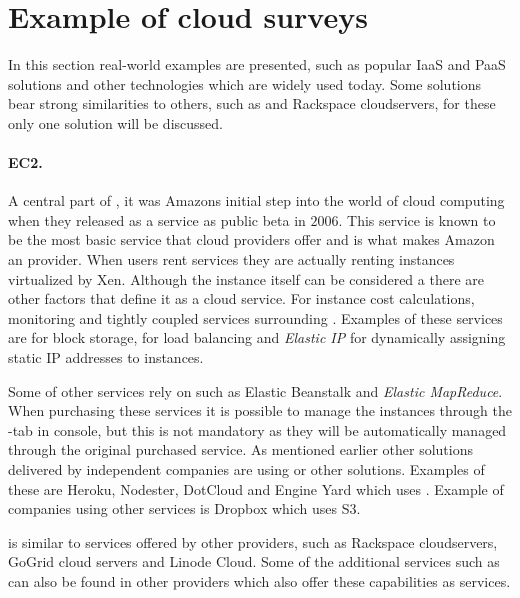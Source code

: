 \section{Example of cloud surveys}

In this section real-world examples are presented, such as popular IaaS and PaaS solutions
and other technologies which are widely used today.
Some solutions bear strong similarities to others, such as  and Rackspace cloudservers,
for these only one solution will be discussed.

\paragraph{EC2.}

A central part of , it was Amazons initial step into the world of cloud computing when
they released  as a service as public beta in $2006$.
This service is known to be the most basic service that cloud providers offer and is 
what makes Amazon an  provider.
When users rent  services they are actually renting  
instances virtualized by Xen.
Although the instance itself can be considered a  there are other factors 
that define it as a cloud service.
For instance cost calculations, monitoring and tightly coupled services surrounding .
Examples of these services are  for block storage, 
 for load balancing and \emph{Elastic IP} 
for dynamically assigning static IP addresses to instances.

Some of  other services rely on  such as  Elastic Beanstalk 
and \emph{Elastic MapReduce}.
When purchasing these services it is possible to manage the  instances 
through the -tab in  console, but this is not mandatory
as they will be automatically managed through the original purchased service.
As mentioned earlier other  solutions delivered by independent companies
are using  or other  solutions.
Examples of these are Heroku, Nodester, DotCloud and Engine Yard which uses .
Example of companies using other  services is Dropbox which uses S3.

 is similar to services offered by other providers, 
such as Rackspace cloudservers, GoGrid cloud servers
and Linode Cloud.
Some of the additional services such as  can also be found in other providers
which also offer these capabilities as services.

